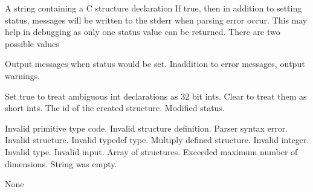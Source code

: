 \begin{manroutinedescription}
\begin{manparametertable}
  A string containing %
a C structure declaration
	If true, then in addition to %
setting status,
			messages will be written to the stderr when
			parsing error occur.  This may help in debugging as
			only one status value can be returned.  There are
			two possible values
\end{manparametertable}
\begin{mantwocolumntable}
Output messages when %
status
				would be set.
Inaddition to error %
messages,
				output warnings.
\end{mantwocolumntable}
\begin{manparametertable}
 Set true to treat ambiguous %
int declarations as
			32 bit ints.  Clear to treat them as short ints.
 The id of the %
created structure.
 Modified status.
\end{manparametertable}
\begin{mantwocolumntable}
Invalid primitive type code.
Invalid structure %
definition.
Parser syntax error.
Invalid structure.
Invalid typedef type.
Multiply defined %
structure.
Invalid integer.
Invalid type.
Invalid input.
Array of structures.
Exceeded maximum number of %
dimensions.
String was empty.
\end{mantwocolumntable}
	None

\end{manroutinedescription}




